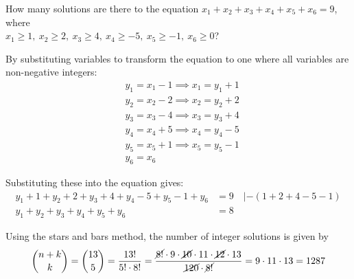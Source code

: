 \documentclass[a4paper,10pt]{article}
\begin{document}
\begin{problem}
	How many solutions are there to the equation $x_{1}+x_{2}+x_{3}+x_{4}+x_{5}+x_{6} = 9$, where \\$x_{1} \geq 1,\ x_{2} \geq 2,\ x_{3} \geq 4,\ x_{4} \geq -5,\ x_{5} \geq -1,\ x_{6} \geq 0$?

	By substituting variables to transform the equation to one where all variables are non-negative integers:
	\[
		\begin{aligned}
			&y_{1} = x_{1}-1 \implies x_{1} = y_{1}+1 \\
			&y_{2} = x_{2}-2 \implies x_{2} = y_{2}+2 \\
			&y_{3} = x_{3}-4 \implies x_{3} = y_{3}+4 \\
			&y_{4} = x_{4}+5 \implies x_{4} = y_{4} - 5 \\
			&y_{5} = x_{5}+1 \implies x_{5} = y_{5}-1 \\
			&y_{6} = x_{6}
		\end{aligned}
	\]

	Substituting these into the equation gives:
	\[
		\begin{aligned}
			y_{1}+1+y_{2}+2+y_{3}+4+y_{4}-5+y_{5}-1+y_{6} &= 9 \quad | - (1+2+4-5-1)\\
			y_{1} + y_{2} + y_{3} + y_{4} + y_{5} + y_{6} &= 8
		\end{aligned}
	\]

	Using the stars and bars method, the number of integer solutions is given by
	\[
		{{n+k}\choose{k}} = {13\choose 5} = \frac{13!}{5! \cdot 8!} = \frac{\cancel {8!} \cdot 9 \cdot \cancel{10} \cdot 11 \cdot \cancel{12} \cdot 13}{\cancel{120} \cdot \cancel{8!}} = 9 \cdot 11 \cdot 13 = 1287
	\]
\end{problem}

\end{document}
